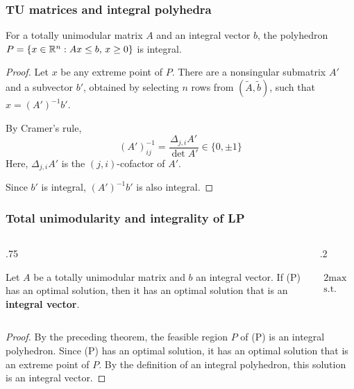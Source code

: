 \documentclass[14pt,aspectratio=169,xcolor=dvipsnames,table,onlytextwidth]{beamer}
\begin{document}
\begin{frame}
    \frametitle{TU matrices and integral polyhedra}

    \small

    \begin{theorem}
        For a totally unimodular matrix $A$ and an integral vector $b$, the polyhedron
        $
        P = \{ x \in \mathbb{R}^n : Ax \leq b, \, x \geq 0 \} 
        $
    is integral.
    \end{theorem}
    
    \pause
    \begin{proof}
    Let $x$ be any extreme point of $P$. There are a nonsingular submatrix $A'$ and a subvector $b'$, obtained by selecting $n$ rows from $(\tilde A, \tilde b)$, such that $x = (A')^{-1}b'$.

    \pause
    \bigskip
    By Cramer's rule,
    \[
        (A')^{-1}_{ij} = \frac{\Delta_{j,i} A'}{\det A'} \in \{0,\pm 1\}
    \]
    {\footnotesize Here, $\Delta_{j,i} A'$ is the $(j,i)$-cofactor of $A'$.}

    \bigskip
    Since $b'$ is integral, $(A')^{-1}b'$ is also integral.
    \end{proof}
\end{frame}

\begin{frame}
    \frametitle{Total unimodularity and integrality of LP}
    
    \begin{columns}[T]
    \begin{column}{.75\textwidth}
    \begin{theorem}[]
        Let $A$ be a totally unimodular matrix and $b$ an integral vector.
        If (P) has an optimal solution, then it has an optimal solution that is an \textbf{integral vector}.
    \end{theorem}
    \end{column}
    \begin{column}{.2\textwidth}
        \footnotesize
    \begin{primal}
        \setlength{\abovedisplayskip}{0pt}
        \begin{alignat*}{2}
            \text{max} & \quad  c^\top x \\
            \text{s.t.} & \quad A x \leq b  \\
            & \quad x \geq 0 
        \end{alignat*}
    \end{primal}
    \end{column}
    \end{columns}

    \pause \vfill
    \begin{proof}
    By the preceding theorem, the feasible region $P$ of (P) is an integral polyhedron.
    Since (P) has an optimal solution, it has an optimal solution that is an extreme point of $P$.
    By the definition of an integral polyhedron, this solution is an integral vector.
    \end{proof}
\end{frame}
\end{document}
